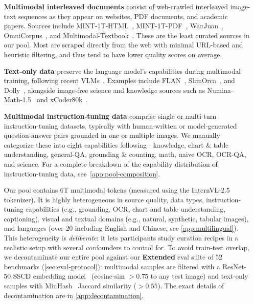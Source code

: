  \textbf{Multimodal interleaved documents} consist of web-crawled interleaved image-text sequences as they appear on websites, PDF documents, and academic papers.
Sources include MINT-1T-HTML~\citep{awadalla2024mint}, MINT-1T-PDF~\citep{awadalla2024mint}, WanJuan~\citep{he2023wanjuan}, OmniCorpus~\citep{li2024omnicorpus}, and Multimodal-Textbook~\citep{zhang2025textbook}.
These are the least curated sources in our pool. 
Most are scraped directly from the web with minimal URL-based and heuristic filtering, and thus tend to have lower quality scores on average. 

 \textbf{Text-only data} preserve the language model's capabilities during multimodal training, following recent VLMs~\citep{zhu2025internvl3,bai2025qwen3}. Examples include FLAN~\citep{longpre2023flan}, SlimOrca~\citep{lian2023slimorca}, and Dolly~\citep{conover2023dolly}, alongside image-free science and knowledge sources such as Numina-Math-1.5~\cite{numina_math_15} and xCoder80k~\cite{wang2024xcoder}.
 
 
 \textbf{Multimodal instruction-tuning data} comprise single or multi-turn instruction-tuning datasets, typically with human-written or model-generated question-answer pairs grounded in one or multiple images.
We manually categorize these into eight capabilities following \cite{wiedmann2025finevision}: knowledge, chart \& table understanding, general-QA, grounding \& counting, math, naive OCR, OCR-QA, and science.
For a complete breakdown of the capability distribution of instruction-tuning data, see\textcolor{black}{~\cref{app:pool-composition}}.

Our \dcvlm{} pool contains 6T multimodal tokens (measured using the InternVL-2.5~\citep{chen2024expanding} tokenizer). It is highly heterogeneous in source quality, data types, instruction-tuning capabilities (e.g., grounding, OCR, chart and table understanding, captioning), visual and textual domains (e.g., natural, synthetic, tabular images), and languages (over $20$ including English and Chinese, see \textcolor{black}{\cref{app:multilingual}}). This heterogeneity is \emph{deliberate}: it lets participants study curation recipes in a realistic setup with several confounders to control for.
To avoid train-test overlap, we decontaminate our entire pool against our \textbf{Extended} eval suite of 52 benchmarks (\cref{sec:eval-protocol}): multimodal samples are filtered with a ResNet-50 SSCD embedding model~\citep{pizzi2022self} (cosine-sim $>0.75$ to any test image) and text-only samples with MinHash~\citep{broder1997resemblance} Jaccard similarity ($>0.55$). 
The exact details of decontamination are in \cref{app:decontamination}.


